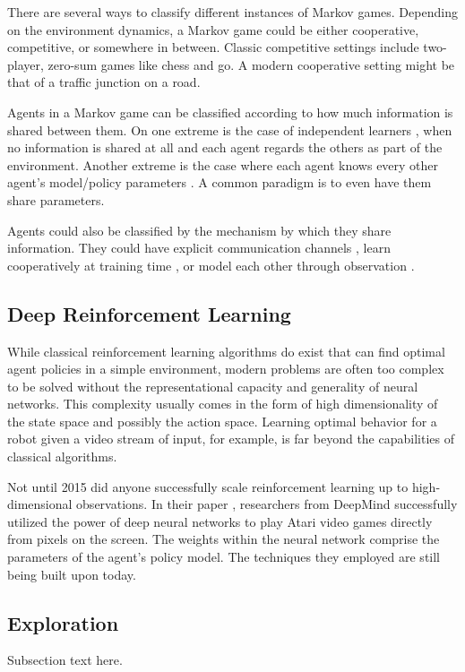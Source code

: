 \documentclass[11pt,journal,compsoc]{IEEEtran}
\begin{document}
	There are several ways to classify different instances of Markov games. Depending on the environment dynamics, a Markov game could be either cooperative, competitive, or somewhere in between. Classic competitive settings include two-player, zero-sum games like chess and go. A modern cooperative setting might be that of a traffic junction on a road. 
	
	Agents in a Markov game can be classified according to how much information is shared between them. On one extreme is the case of independent learners \cite{bansal_mujoco}\!\cite{leibo_social_dilemmas}\!\cite{tampuu_pong}, when no information is shared at all and each agent regards the others as part of the environment. Another extreme is the case where each agent knows every other agent's model/policy parameters \cite{lola}. A common paradigm is to even have them share parameters.
	
	Agents could also be classified by the mechanism by which they share information. They could have explicit communication channels \cite{sukhbaatar_commnet}\!\cite{foerster_dial}\!\cite{peng_bicnet}, learn cooperatively at training time \cite{lowe_maddpg}\!\cite{foerster_coma}\!\cite{rashid_qmix}, or model each other through observation \cite{raileanu_som}\!\cite{hong_dpiqn}\!\cite{mtom}. 
	
	\subsection{Deep Reinforcement Learning}
	While classical reinforcement learning algorithms do exist that can find optimal agent policies in a simple environment, modern problems are often too complex to be solved without the representational capacity and generality of neural networks. This complexity usually comes in the form of high dimensionality of the state space and possibly the action space. Learning optimal behavior for a robot given a video stream of input, for example, is far beyond the capabilities of classical algorithms.
	
	Not until 2015 did anyone successfully scale reinforcement learning up to high-dimensional observations. In their paper \cite{dqn}, researchers from DeepMind successfully utilized the power of deep neural networks to play Atari video games directly from pixels on the screen. The weights within the neural network comprise the parameters of the agent's policy model. The techniques they employed are still being built upon today.
	
	\subsection{Exploration}
	Subsection text here.
	\cite{social_influence}
	\cite{asymmetric_selfplay}
	\cite{prediction_error}
	\cite{hashing}
	\cite{malthusian_rl}
	\cite{seed_sampling}
	\cite{a3c}
	
\end{document}

